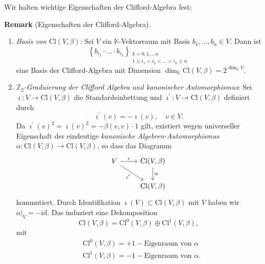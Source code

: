 \documentclass[10pt, letterpaper]{article}
\newcommand{\K}{\mathbb{K}}
\newcommand{\Z}{\mathbb{Z}}
\newcommand{\Cl}{\mathrm{Cl}}
\newcommand{\CustomHeading}[3]{%
  \par\medskip\noindent%
  \textbf{#1 #2} \textnormal{(#3)}.\enskip%
}
\newenvironment{REM}[2]{\CustomHeading{Remark}{#1}{#2}}{}
\begin{document}
\bigskip




Wir halten wichtige Eigenschaften der Clifford-Algebra fest:

\begin{REM}{}{Eigenschaften der Clifford-Algebra}
\begin{enumerate}
  \item \emph{Basis von $\Cl(V,\beta)$}: Sei $V$ ein $\K$-Vektorraum mit Basis $b_1, \ldots, b_n \in V$. Dann ist 
    $$
    \left\{b_{i_1} \cdot \ldots \cdot b_{i_k}\right\}_{\substack{k=0,1, \ldots n \\ 1 \leq i_1<i_2<\ldots<i_k \leq n}}
    $$
    eine Basis der Clifford-Algebra mit Dimension $\operatorname{dim}_{\mathbb{K}} \mathrm{Cl}(V, \beta)=2^{\operatorname{dim}_{\mathbb{K}} V}$.
  \item \emph{$\Z_2$-Graduierung der Clifford Algebra und kanonischer Automorphismus}: Sei $\imath: V \rightarrow \mathrm{Cl}(V, \beta)$ die Standardeinbettung und $\imath^{\prime}: V \rightarrow \mathrm{Cl}(V, \beta)$ definiert durch
    $$
    \imath^{\prime}(v)=-\imath(v), \quad  v \in V .
    $$
    Da $\imath^{\prime}(v)^2=\imath(v)^2=-\beta(v, v) \cdot 1$ gilt, existiert wegen universeller Eigenschaft der eindeutige \emph{kanonische Algebren-Automorphismus} $\alpha: \mathrm{Cl}(V, \beta) \rightarrow \mathrm{Cl}(V, \beta)$, so dass das Diagramm
    \[
    \begin{tikzcd}
    V \arrow[r, "\iota"] \arrow[dr, "\iota'"'] & \Cl(V,\beta) \arrow[d, "\alpha"] \\
    & \Cl(V,\beta)
    \end{tikzcd}
    \]
    kommutiert. Durch Identifikation $\imath(V) \subset \mathrm{Cl}(V, \beta)$ mit $V$ haben wir $\left.\alpha\right|_V=-\mathrm{id}$. Das induziert eine Dekomposition 
    $$
    \mathrm{Cl}(V, \beta)=\mathrm{Cl}^0(V, \beta) \oplus \mathrm{Cl}^1(V, \beta),
    $$
    mit
    $$
    \begin{aligned}
    & \mathrm{Cl}^0(V, \beta)=+1-\text {Eigenraum von } \alpha \\
    & \mathrm{Cl}^1(V, \beta)=-1-\text {Eigenraum von } \alpha.
    \end{aligned}
    $$
\end{enumerate}
\end{REM}
\end{document}

